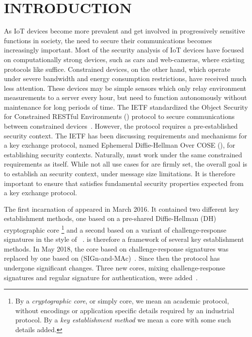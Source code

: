 \documentclass[a4paper,twoside,draft]{article}
\begin{document}
\section{\uppercase{Introduction}}
\label{sec:introduction}

As IoT devices become more prevalent and get involved in progressively sensitive
functions in society, the need to secure their communications
becomes increasingly important.
%
Most of the security analysis of IoT devices have focused on computationally
strong devices, such as cars and web-cameras, where existing protocols like
\mDandTls{} suffice.
%
Constrained devices, on the other hand, which operate under severe
bandwidth and energy consumption restrictions, have received much less
attention.
%
These devices may be simple sensors which only relay environment
measurements to a server every hour, but need to function autonomously without
maintenance for long periods of time.
%
The IETF standardized the Object Security for
Constrained RESTful Environments (\mOscore{}) protocol to secure communications
between constrained devices~\cite{rfc8613}.
%
However, the \mOscore{} protocol requires a pre-established security context.
%
The IETF has been discussing requirements and mechanisms for a key
exchange protocol, named Ephemeral Diffie-Hellman Over COSE (\mEdhoc), for
establishing \mOscore{} security contexts.
%
Naturally, \mEdhoc{} must work under the same constrained requirements as
\mOscore{} itself.
%
While not all use cases for \mEdhoc{} are firmly set, the overall goal is to
establish an \mOscore{} security context, under message size limitations.
%
It is therefore important to ensure that \mEdhoc{} satisfies fundamental
security properties expected from a key exchange protocol.
%

The first incarnation of \mEdhoc{} appeared in March 2016.
%
It contained two different key establishment methods, one based on a
pre-shared Diffie-Hellman (DH) cryptographic core%
\footnote{By a \emph{cryptographic core}, or simply core, we mean an academic protocol,
without encodings or application specific details required by an industrial
protocol.
%
By a \emph{key establishment method} we mean a core with some such details added.
}
and a second based on a
variant of challenge-response signatures in the style of 
\mOptls{}~\cite{DBLP:conf/eurosp/KrawczykW16}.
%
\mEdhoc{} is therefore a framework of several key establishment methods.
%
In May 2018, the core based on challenge-response signatures was replaced by
one based on \mSigma{} (SIGn-and-MAc)~\cite{bruni-analysis-selander-ace-cose-ecdhe-08}.
%
Since then the protocol has undergone significant changes.
%
Three new cores, mixing challenge-response signatures and regular signature for
authentication, were added~\cite{our-analysis-selander-lake-edhoc-00}.
%
\end{document}
